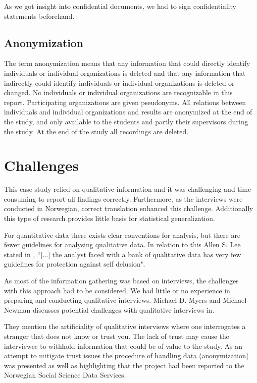As we got insight into confidential documents, we had to sign confidentiality statements beforehand.


\subsection{Anonymization}
The term anonymization means that any information that could directly identify individuals or individual organizations is deleted and that any information that indirectly could identify individuals or individual organizations is deleted or changed. No individuals or individual organizations are recognizable in this report. Participating organizations are given pseudonyms. All relations between individuals and individual organizations and results are anonymized at the end of the study, and only available to the students and partly their supervisors during the study. At the end of the study all recordings are deleted.

\section{Challenges}
This case study relied on qualitative information and it was challenging and time consuming to report all findings correctly. Furthermore, as the interviews were conducted in Norwegian, correct translation enhanced this challenge. Additionally this type of research provides little basis for statistical generalization. \cite{CaseStudyResearch}

For quantitative data there exists clear conventions for analysis, but there are fewer guidelines for analysing qualitative data. In relation to this Allen S. Lee stated in \cite{lee1989scientific}, ``[...] the analyst faced with a bank of qualitative data has very few guidelines for protection against self delusion".

As most of the information gathering was based on interviews, the challenges with this approach had to be considered. We had little or no experience in preparing and conducting qualitative interviews. Michael D. Myers and Michael Newman discusses potential challenges with qualitative interviews in\cite{myers2007qualitative}. 

They mention the artificiality of qualitative interviews where one interrogates a stranger that does not know or trust you. The lack of trust may cause the interviewee to withhold information that could be of value to the study. As an attempt to mitigate trust issues the procedure of handling data (anonymization) was presented as well as highlighting that the project had been reported to the Norwegian Social Science Data Services.   


